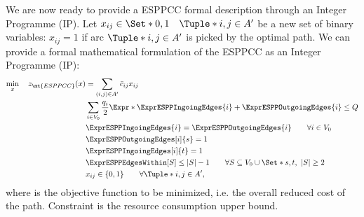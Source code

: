 \medskip

We are now ready to provide a ESPPCC formal description through an Integer Programme (IP).
Let $x_{ij} \in \Set*{0, 1} \quad \Tuple*{i, j} \in A^\prime$ be a new set of binary variables:
$x_{ij} = 1$ if arc $\Tuple*{i, j} \in A^\prime$ is picked by the optimal path.
We can provide a formal mathematical formulation of the ESPPCC as an Integer Programme (IP):
\begin{align}
	\min_{x} \quad z_\mt{ESPPCC}(x) & =  \sum_{(i, j) \in A^\prime} \bar{c}_{ij} x_{ij}                                                     \label{eq:espprc-obj-function}                                                                \\
	                                & \sum_{i \in V_0} \frac{q_i}{2} \Expr*{ \ExprESPPIngoingEdges{i} + \ExprESPPOutgoingEdges{i} }  \le Q  \label{eq:espprc-resource-upper-bound-constraint}                                             \\
	                                & \ExprESPPIngoingEdges{i} = \ExprESPPOutgoingEdges{i}                                                  \qquad \forall i \in V_0          \label{eq:espprc-flow-conservation-constraint-customers}    \\
	                                & \ExprESPPOutgoingEdges[i]{s} = 1                                                                      \label{eq:espprc-source-emitting-flow}                                                        \\
	                                & \ExprESPPIngoingEdges[i]{t} = 1                                                                       \label{eq-espprc-sink-consuming-flow}                                                         \\
	                                & \ExprESPPEdgesWithin[S] \le |S| - 1                                                                   \qquad \forall S \subseteq V_0 \cup \Set*{s, t},\ |S| \ge 2 \label{eq:espprc-sec-constraints} \\
	                                & x_{ij}                   \in \lbrace 0, 1 \rbrace                                                     \qquad \forall \Tuple*{i, j} \in A^\prime    \label{eq:espprc-x-mip-var-bounds},
\end{align}
where  is the objective function to be minimized, i.e. the overall reduced cost of the path.
Constraint  is the resource consumption upper bound.
